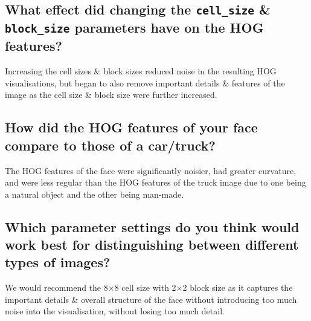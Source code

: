 \documentclass[a4paper]{article}
\begin{document}
\subsection{What effect did changing the \texttt{cell_size} \& \texttt{block_size} parameters have on the HOG features?}
Increasing the cell sizes \& block sizes reduced noise in the resulting HOG visualisations, but began to also remove important details \& features of the image as the cell size \& block size were further increased.

\subsection{How did the HOG features of your face compare to those of a car/truck?}
The HOG features of the face were significantly noisier, had greater curvature, and were less regular than the HOG features of the truck image due to one being a natural object and the other being man-made.

\subsection{Which parameter settings do you think would work best for distinguishing between different types of images?}
We would recommend the 8$\times$8 cell size with 2$\times$2 block size as it captures the important details \& overall structure of the face without introducing too much noise into the visualisation, without losing too much detail.
\end{document}
